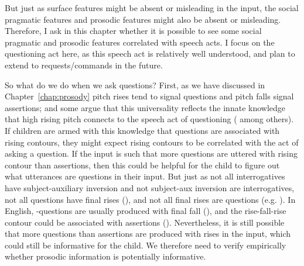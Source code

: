 But just as surface features might be absent or misleading in the input, the social pragmatic features and prosodic features might also be absent or misleading. Therefore, I ask in this chapter whether it is possible to see some social pragmatic and prosodic features correlated with speech acts. I focus on the questioning act here, as this speech act is relatively well understood, and plan to extend to requests/commands in the future.

So what do we do when we ask questions? First, 
as we have discussed in Chapter~\ref{chap:prosody} pitch rises tend to signal questions and pitch falls signal assertions; and some argue that this universality reflects the innate knowledge that high rising pitch connects to the speech act of questioning (\cite{ohala1984,gussenhovenchen2000,gussenhoven2002} among others). If children are armed with this knowledge that questions are associated with rising contours, they might expect rising contours to be correlated with the act of asking a question. If the input is such that more questions are uttered with rising contour than assertions, then this could be helpful for the child to figure out what utterances are  questions in their input. But just as not all interrogatives have subject-auxiliary inversion and not subject-aux inversion are interrogatives, not all questions have final rises (\cite{gussenhoven2000fallq, hedberg2004wh,ladd2008intonational}), and not all final rises are questions (e.g. \cite{gordon1999prosody,ladd1981, ward1985rfr,goodhue2016prosody}). In English, \twh-questions are usually produced with final fall (\cite{hedberg2004wh,ladd2008intonational}), and the rise-fall-rise contour could be associated with assertions (\cite{ladd1981, ward1985rfr,goodhue2016prosody}). Nevertheless, it is still possible that more questions than assertions are produced with rises in the input, which could still be informative for the child. We therefore need to verify empirically whether prosodic information is potentially informative.


